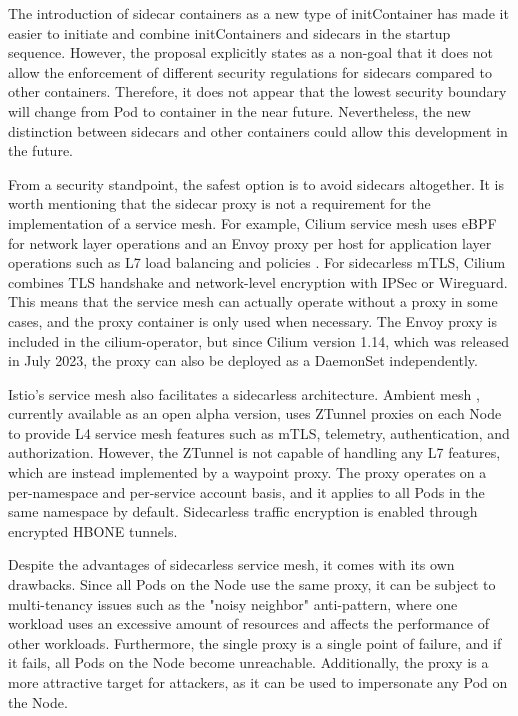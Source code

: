 \documentclass[english, 12pt, a4paper, sci, utf8, a-2b, online]{aaltothesis}
\begin{document}
The introduction of sidecar containers as a new type of initContainer has made it easier to initiate and combine initContainers and sidecars in the startup sequence.
However, the proposal explicitly states as a non-goal that it does not allow the enforcement of different security regulations for sidecars compared to other containers.
Therefore, it does not appear that the lowest security boundary will change from Pod to container in the near future.
Nevertheless, the new distinction between sidecars and other containers could allow this development in the future.

From a security standpoint, the safest option is to avoid sidecars altogether.
It is worth mentioning that the sidecar proxy is not a requirement for the implementation of a service mesh.
For example, Cilium service mesh uses eBPF for network layer operations and an Envoy proxy per host for application layer operations such as L7 load balancing and policies \cite{cilium-114}.
For sidecarless mTLS, Cilium combines TLS handshake and network-level encryption with IPSec or Wireguard.
This means that the service mesh can actually operate without a proxy in some cases, and the proxy container is only used when necessary.
The Envoy proxy is included in the cilium-operator, but since Cilium version 1.14, which was released in July 2023, the proxy can also be deployed as a DaemonSet independently.

Istio's service mesh also facilitates a sidecarless architecture.
Ambient mesh \cite{istio-ambient-mesh}, currently available as an open alpha version, uses ZTunnel proxies on each Node to provide L4 service mesh features such as mTLS, telemetry, authentication, and authorization.
However, the ZTunnel is not capable of handling any L7 features, which are instead implemented by a waypoint proxy.
The proxy operates on a per-namespace and per-service account basis, and it applies to all Pods in the same namespace by default.
Sidecarless traffic encryption is enabled through encrypted HBONE tunnels.

Despite the advantages of sidecarless service mesh, it comes with its own drawbacks.
Since all Pods on the Node use the same proxy, it can be subject to multi-tenancy issues such as the "noisy neighbor" anti-pattern, where one workload uses an excessive amount of resources and affects the performance of other workloads.
Furthermore, the single proxy is a single point of failure, and if it fails, all Pods on the Node become unreachable.
Additionally, the proxy is a more attractive target for attackers, as it can be used to impersonate any Pod on the Node.
\end{document}
